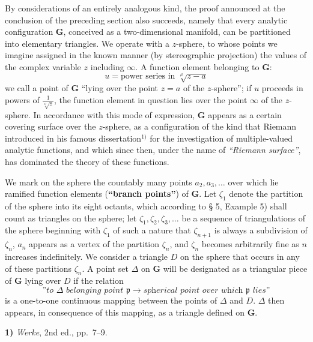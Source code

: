 \documentclass{article}
\begin{document}
By considerations of an entirely analogous kind, the proof announced at the conclusion of the preceding section also succeeds, namely that every analytic configuration $\mathbf{G}$, conceived as a two-dimensional manifold, can be partitioned into elementary triangles. We operate with a $z$-sphere, to whose points we imagine assigned in the known manner (by stereographic projection) the values of the complex variable $z$ including $\infty$. A function element belonging to $\mathbf{G}$:
\[
u = \text{power series in } \sqrt[\mu]{z - a}
\]
we call a point of $\mathbf{G}$ ``lying over the point $z = a$ of the $z$-sphere''; if $u$ proceeds in powers of $\frac{1}{\sqrt[\nu]{z}}$, the function element in question lies over the point $\infty$ of the $z$-sphere. In accordance with this mode of expression, $\mathbf{G}$ appears as a certain covering surface over the $z$-sphere, as a configuration of the kind that Riemann introduced in his famous dissertation${}^{1)}$ for the investigation of multiple-valued analytic functions, and which since then, under the name of \emph{``Riemann surface''}, has dominated the theory of these functions.

We mark on the sphere the countably many points $a_2, a_3, \dots$ over which lie ramified function elements (\textbf{``branch points''}) of $\mathbf{G}$. Let $\zeta_1$ denote the partition of the sphere into its eight octants, which according to § 5, Example 5) shall count as triangles on the sphere; let $\zeta_1, \zeta_2, \zeta_3, \dots$ be a sequence of triangulations of the sphere beginning with $\zeta_1$ of such a nature that $\zeta_{n+1}$ is always a subdivision of $\zeta_n$, $a_n$ appears as a vertex of the partition $\zeta_n$, and $\zeta_n$ becomes arbitrarily fine as $n$ increases indefinitely. We consider a triangle $D$ on the sphere that occurs in any of these partitions $\zeta_n$. A point set $\Delta$ on $\mathbf{G}$ will be designated as a triangular piece of $\mathbf{G}$ lying over $D$ if the relation
\[
\text{''}\textit{to }\Delta\textit{ belonging point }\mathfrak{p} \to \textit{spherical point over which }\mathfrak{p}\textit{ lies}\text{''}
\]
is a one-to-one continuous mapping between the points of $\Delta$ and $D$. $\Delta$ then appears, in consequence of this mapping, as a triangle defined on $\mathbf{G}$.

\textbf{1)} \emph{Werke}, 2nd ed., pp.\ 7--9.
\end{document}
